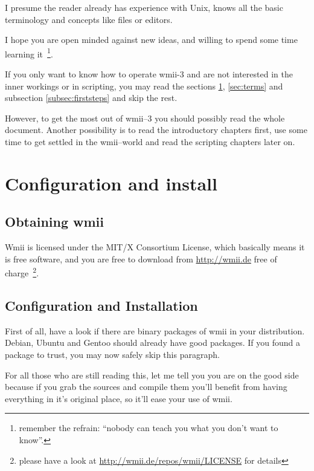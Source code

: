 \documentclass[12pt,a4paper]{article} %
\newcommand{\hrefx}[1]{\href{#1}{#1}} %
\begin{document}
    I presume the reader already has experience with Unix, knows all
    the basic terminology and concepts like files or editors.

    I hope you are open minded against new ideas, and willing to spend
    some time learning it~\footnote{remember the refrain: ``nobody can
    teach you what you don't want to know''.}.

    If you only want to know how to operate wmii-3 and are not
    interested in the inner workings or in scripting, you may read the
    sections \ref{sec:conf&install}, \ref{sec:terms} and subsection 
    \ref{subsec:firststeps} and skip the rest.

    However, to get the most out of wmii--3 you should possibly read
    the whole document. Another possibility is to read the
    introductory chapters first, use some time to get settled in the
    wmii--world and read the scripting chapters later on.
  
\section{Configuration and install}
\label{sec:conf&install}

  \subsection{Obtaining wmii}

    Wmii is licensed under the MIT/X Consortium License, which
    basically means it is free software, and you are free to download
    from \hrefx{http://wmii.de} free of charge~\footnote{ please have
    a look at \hrefx{http://wmii.de/repos/wmii/LICENSE}  for
    details}.
  
  \subsection{Configuration and Installation}
  
    First of all, have a look if there are binary packages of wmii in
    your distribution. Debian, Ubuntu and Gentoo should already have
    good packages. If you found a package to trust, you may now safely
    skip this paragraph.

    For all those who are still reading this, let me tell you you are
    on the good side because if you grab the sources and compile them
    you'll benefit from having everything in it's original place, so
    it'll ease your use of wmii.
    
\end{document}
